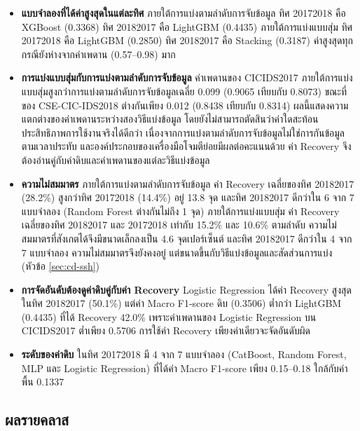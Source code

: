 \begin{itemize}
    \item \textbf{แบบจำลองที่ได้ค่าสูงสุดในแต่ละทิศ} ภายใต้การแบ่งตามลำดับการจับข้อมูล ทิศ 2017\dirarrow{}2018 คือ XGBoost (0.3368) ทิศ 2018\dirarrow{}2017 คือ LightGBM (0.4435) ภายใต้การแบ่งแบบสุ่ม ทิศ 2017\dirarrow{}2018 คือ LightGBM (0.2850) ทิศ 2018\dirarrow{}2017 คือ Stacking (0.3187) ค่าสูงสุดทุกกรณียังห่างจากค่าเพดาน (0.57--0.98) มาก
    \item \textbf{การแบ่งแบบสุ่มกับการแบ่งตามลำดับการจับข้อมูล} ค่าเพดานของ CICIDS2017 ภายใต้การแบ่งแบบสุ่มสูงกว่าการแบ่งตามลำดับการจับข้อมูลเฉลี่ย 0.099 (0.9065 เทียบกับ 0.8073) ขณะที่ของ CSE-CIC-IDS2018 ต่างกันเพียง 0.012 (0.8438 เทียบกับ 0.8314) ผลนี้แสดงความแตกต่างของค่าเพดานระหว่างสองวิธีแบ่งข้อมูล โดยยังไม่สามารถตัดสินว่าค่าใดสะท้อนประสิทธิภาพการใช้งานจริงได้ดีกว่า เนื่องจากการแบ่งตามลำดับการจับข้อมูลไม่ใช่การกันข้อมูลตามเวลาประทับ และองค์ประกอบของเครื่องมือโจมตีย่อยมีผลต่อคะแนนด้วย ค่า Recovery จึงต้องอ่านคู่กับค่าดิบและค่าเพดานของแต่ละวิธีแบ่งข้อมูล
    \item \textbf{ความไม่สมมาตร} ภายใต้การแบ่งตามลำดับการจับข้อมูล ค่า Recovery เฉลี่ยของทิศ 2018\dirarrow{}2017 (28.2\%) สูงกว่าทิศ 2017\dirarrow{}2018 (14.4\%) อยู่ 13.8 จุด และทิศ 2018\dirarrow{}2017 ดีกว่าใน 6 จาก 7 แบบจำลอง (Random Forest ต่างกันไม่ถึง 1 จุด) ภายใต้การแบ่งแบบสุ่ม ค่า Recovery เฉลี่ยของทิศ 2018\dirarrow{}2017 และ 2017\dirarrow{}2018 เท่ากับ 15.2\% และ 10.6\% ตามลำดับ ความไม่สมมาตรที่สังเกตได้จึงมีขนาดเล็กลงเป็น 4.6 จุดเปอร์เซ็นต์ และทิศ 2018\dirarrow{}2017 ดีกว่าใน 4 จาก 7 แบบจำลอง ความไม่สมมาตรจึงยังคงอยู่ แต่ขนาดขึ้นกับวิธีแบ่งข้อมูลและสัดส่วนการแบ่ง (หัวข้อ \ref{sec:cd-ssh})
    \item \textbf{การจัดอันดับต้องดูค่าดิบคู่กับค่า Recovery} Logistic Regression ได้ค่า Recovery สูงสุดในทิศ 2018\dirarrow{}2017 (50.1\%) แต่ค่า Macro F1-score ดิบ (0.3506) ต่ำกว่า LightGBM (0.4435) ที่ได้ Recovery 42.0\% เพราะค่าเพดานของ Logistic Regression บน CICIDS2017 ต่ำเพียง 0.5706 การใช้ค่า Recovery เพียงค่าเดียวจะจัดอันดับผิด
    \item \textbf{ระดับของค่าดิบ} ในทิศ 2017\dirarrow{}2018 มี 4 จาก 7 แบบจำลอง (CatBoost, Random Forest, MLP และ Logistic Regression) ที่ได้ค่า Macro F1-score เพียง 0.15--0.18 ใกล้กับค่าพื้น 0.1337
\end{itemize}

\subsection{ผลรายคลาส}
\label{sec:cd-per-class}

